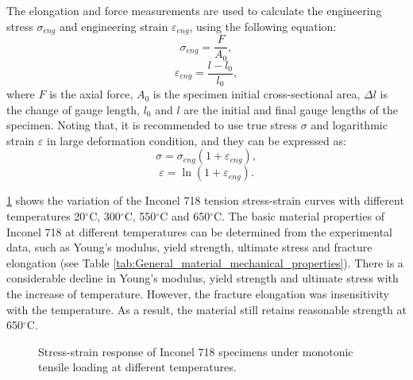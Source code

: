 The elongation and force measurements are used to calculate the engineering stress $\sigma_{eng}$ and engineering strain $\varepsilon_{eng}$, using the following equation:
\begin{equation}
\sigma_{eng}=\frac{F}{A_0},
\end{equation}
\begin{equation}
\varepsilon_{eng}=\frac{l-l_0}{l_0},
\end{equation}
where $F$ is the axial force, $A_0$ is the specimen initial cross-sectional area, $\Delta l$ is the change of gauge length, $l_0$ and $l$ are the initial and final gauge lengths of the specimen.
Noting that, it is recommended to use true stress $\sigma$ and logarithmic strain $\varepsilon$ in large deformation condition, and they can be expressed as:
\begin{equation}
\sigma=\sigma_{eng}(1+\varepsilon_{eng}),
\end{equation}
\begin{equation}
\varepsilon=\ln(1+\varepsilon_{eng}).
\end{equation}

\ref{Fig:IN718_Monotonic_Tension} shows the variation of the Inconel 718 tension stress-strain curves with different temperatures 20$^{\circ}$C, 300$^{\circ}$C, 550$^{\circ}$C and 650$^{\circ}$C.
The basic material properties of Inconel 718 at different temperatures can be determined from the experimental data, such as Young's modulus, yield strength, ultimate stress and fracture elongation (see Table \ref{tab:General_material_mechanical_properties}).
There is a considerable decline in Young's modulus, yield strength and ultimate stress with the increase of temperature.
However, the fracture elongation was insensitivity with the temperature.
As a result, the material still retains reasonable strength at 650$^{\circ}$C.

\begin{figure}[!htp]
\centering{}
\caption{Stress-strain response of Inconel 718 specimens under monotonic tensile loading at different temperatures.}
\label{Fig:IN718_Monotonic_Tension}
\end{figure}

